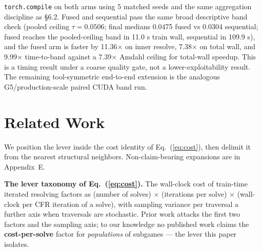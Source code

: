 \documentclass[11pt]{article}
\begin{document}
\begin{itemize}
\texttt{torch.compile} on both arms using 5 matched seeds and the same aggregation
discipline as \S6.2. Fused and sequential pass the same broad descriptive band check
(pooled ceiling $\tau=0.0506$; final medians 0.0475 fused vs 0.0304 sequential; fused
reaches the pooled-ceiling band in 11.0 s train wall, sequential in 109.9 s), and the fused arm is
faster by 11.36$\times$ on inner resolve, 7.38$\times$ on total wall, and
9.99$\times$ time-to-band against a 7.39$\times$ Amdahl ceiling for total-wall speedup.
This is a timing result under a coarse quality gate, not a lower-exploitability result.
The remaining tool-symmetric end-to-end extension is the analogous G5/production-scale
paired CUDA band run.
\end{itemize}

\section{Related Work}

We position the lever inside the cost identity of Eq.~(\ref{eq:cost}), then delimit it
from the nearest structural neighbors. Non-claim-bearing expansions are in Appendix~E.

\textbf{The lever taxonomy of Eq.~(\ref{eq:cost}).} The wall-clock cost of train-time
iterated resolving factors as (number of solves) $\times$ (iterations per solve)
$\times$ (wall-clock per CFR iteration of a solve), with sampling variance per traversal
a further axis when traversals are stochastic. Prior work attacks the first two factors
and the sampling axis; to our knowledge no published work claims the
\textbf{cost-per-solve} factor for \emph{populations} of subgames --- the lever this
paper isolates.
\end{document}
